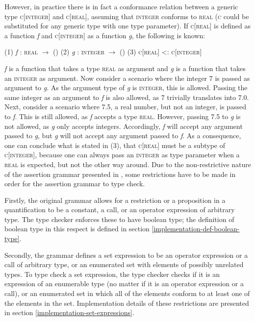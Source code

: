 However, in practice there is in fact a conformance relation between a generic type  \textsc{c}[\textsc{integer}] and \textsc{c}[\textsc{real}], assuming that \textsc{integer} conforms to \textsc{real} (\textsc{c} could be substituted for any generic type with one type parameter). If \textsc{c}[\textsc{real}] is defined as a function \textit{f} and \textsc{c}[\textsc{integer}] as a function \textit{g}, the following is known:
\newline\newline
\centerline{
\footnotesize{
(1) \textit{f} : \textsc{real} $\rightarrow$ ()\newline
(2) \textit{g} : \textsc{integer} $\rightarrow$ ()\newline
(3) \textsc{c}[\textsc{real}] \textless : \textsc{c}[\textsc{integer}]
}}
\newline\newline
\textit{f} is a function that takes a type \textsc{real} as argument and \textit{g} is a function that takes an \textsc{integer} as argument. Now consider a scenario where the integer 7 is passed as argument to \textit{g}. As the argument type of \textit{g} is \textsc{integer}, this is allowed. Passing the same integer as an argument to \textit{f} is also allowed, as 7 trivially translates into 7.0. Next, consider a scenario where 7.5, a real number, but not an integer, is passed to \textit{f}. This is still allowed, as \textit{f} accepts a type \textsc{real}. However, passing 7.5 to \textit{g} is not allowed, as \textit{g} only accepts integers. Accordingly, \textit{f} will accept any argument passed to \textit{g}, but \textit{g} will not accept any argument passed to \textit{f}. As a consequence, one can conclude what is stated in (3), that  \textsc{c}[\textsc{real}] must be a subtype of \textsc{c}[\textsc{integer}], because one can always pass an \textsc{integer} as type parameter when a \textsc{real} is expected, but not the other way around.
Due to the non-restrictive nature of the assertion grammar presented in \cite{walden1995}, some restrictions have to be made in order for the assertion grammar to type check.

Firstly, the original grammar allows for a restriction or a proposition in a quantification to be a constant, a call, or an operator expression of arbitrary type. The type checker enforces these to have boolean type; the definition of boolean type in this respect is defined in section \ref{implementation-def-boolean-type}.

Secondly,  the grammar defines a set expression to be an operator expression or a call of arbitrary type, or an enumerated set with elements of possibly unrelated types. To type check a set expression, the type checker checks if it is an expression of an enumerable type (no matter if it is an operator expression or a call), or an enumerated set in which all of the elements conform to at least one of the elements in the set. Implementation details of these restrictions are presented in section \ref{implementation-set-expressions}.



